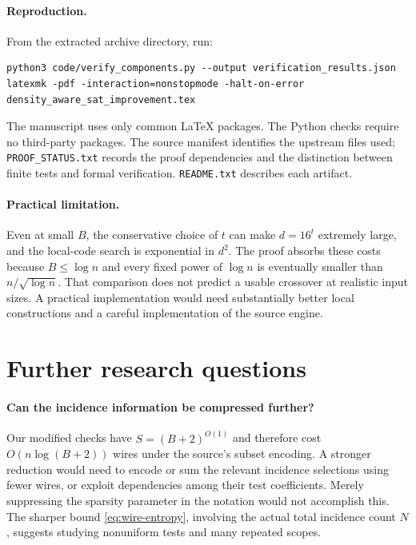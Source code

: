 \documentclass[11pt]{article}
\numberwithin{equation}{section}
\theoremstyle{definition}\newtheorem{definition}[theorem]{Definition}
\theoremstyle{remark}\newtheorem{remark}[theorem]{Remark}
\begin{document}
\paragraph{Reproduction.}
From the extracted archive directory, run:
\begin{lstlisting}
python3 code/verify_components.py --output verification_results.json
latexmk -pdf -interaction=nonstopmode -halt-on-error density_aware_sat_improvement.tex
\end{lstlisting}
The manuscript uses only common LaTeX packages. The Python checks
require no third-party packages. The source manifest identifies the
upstream files used; \texttt{PROOF\_STATUS.txt} records the proof
dependencies and the distinction between finite tests and formal
verification. \texttt{README.txt} describes each artifact.

\paragraph{Practical limitation.}
Even at small $B$, the conservative choice of $t$ can make $d=16^t$
extremely large, and the local-code search is exponential in $d^2$.
The proof absorbs these costs because $B\le\log n$ and every fixed
power of $\log n$ is eventually smaller than
$n/\sqrt{\log n}$. That comparison does not predict a usable
crossover at realistic input sizes. A practical implementation would
need substantially better local constructions and a careful
implementation of the source engine.

\section{Further research questions}
\label{sec:future}

\paragraph{Can the incidence information be compressed further?}
Our modified checks have $S=(B+2)^{O(1)}$ and therefore cost
$O(n\log(B+2))$ wires under the source's subset encoding. A
stronger reduction would need to encode or sum the relevant
incidence selections using fewer wires, or exploit dependencies
among their test coefficients. Merely suppressing the sparsity
parameter in the notation would not accomplish this. The sharper
bound \eqref{eq:wire-entropy}, involving the actual total incidence
count $N$, suggests studying nonuniform tests and many repeated
scopes.
\end{document}
